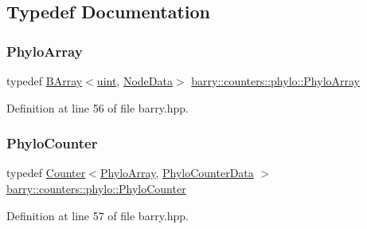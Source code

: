 \subsection{Typedef Documentation}
\mbox{\label{namespacebarry_1_1counters_1_1phylo_abd293bf65e494e903639fb5fb2c91604}} 
\subsubsection{\texorpdfstring{Phylo\+Array}{PhyloArray}}
{\footnotesize\ttfamily typedef \hyperlink{classbarry_1_1_b_array}{B\+Array}$<$\hyperlink{namespacebarry_a11dfc53ddb4672278319aa04f1e09a6c}{uint}, \hyperlink{classbarry_1_1counters_1_1phylo_1_1_node_data}{Node\+Data}$>$ \hyperlink{namespacebarry_1_1counters_1_1phylo_abd293bf65e494e903639fb5fb2c91604}{barry\+::counters\+::phylo\+::\+Phylo\+Array}}



Definition at line 56 of file barry.\+hpp.

\mbox{\label{namespacebarry_1_1counters_1_1phylo_a6523924ce3465c5b212584c57664f953}} 
\subsubsection{\texorpdfstring{Phylo\+Counter}{PhyloCounter}}
{\footnotesize\ttfamily typedef \hyperlink{classbarry_1_1_counter}{Counter}$<$\hyperlink{namespacebarry_1_1counters_1_1phylo_abd293bf65e494e903639fb5fb2c91604}{Phylo\+Array}, \hyperlink{namespacebarry_1_1counters_1_1phylo_a6ecc0d8ab76f8dc2db152221a8e9e95a}{Phylo\+Counter\+Data} $>$ \hyperlink{namespacebarry_1_1counters_1_1phylo_a6523924ce3465c5b212584c57664f953}{barry\+::counters\+::phylo\+::\+Phylo\+Counter}}



Definition at line 57 of file barry.\+hpp.

\mbox{\label{namespacebarry_1_1counters_1_1phylo_a6ecc0d8ab76f8dc2db152221a8e9e95a}} 

